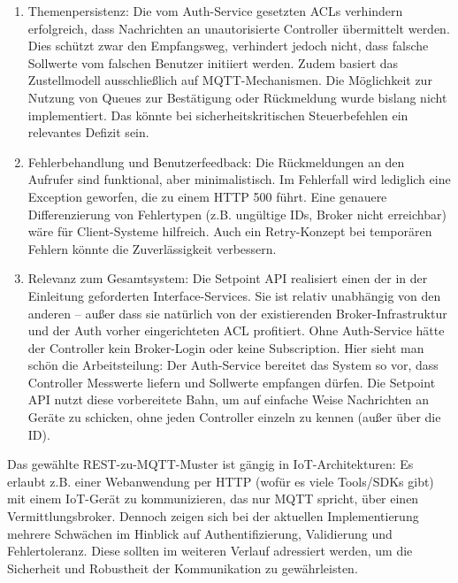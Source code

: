 \begin{enumerate}
    \item Themenpersistenz: Die vom Auth-Service gesetzten ACLs verhindern erfolgreich, dass Nachrichten an unautorisierte Controller übermittelt werden. Dies schützt zwar den Empfangsweg, verhindert jedoch nicht, dass falsche Sollwerte vom falschen Benutzer initiiert werden. Zudem basiert das Zustellmodell ausschließlich auf MQTT-Mechanismen. Die Möglichkeit zur Nutzung von Queues zur Bestätigung oder Rückmeldung wurde bislang nicht implementiert. Das könnte bei sicherheitskritischen Steuerbefehlen ein relevantes Defizit sein.
    \item Fehlerbehandlung und Benutzerfeedback: Die Rückmeldungen an den Aufrufer sind funktional, aber minimalistisch. Im Fehlerfall wird lediglich eine Exception geworfen, die zu einem HTTP 500 führt. Eine genauere Differenzierung von Fehlertypen (z.B. ungültige IDs, Broker nicht erreichbar) wäre für Client-Systeme hilfreich. Auch ein Retry-Konzept bei temporären Fehlern könnte die Zuverlässigkeit verbessern.
    \item Relevanz zum Gesamtsystem: Die Setpoint API realisiert einen der in der Einleitung geforderten Interface-Services. Sie ist relativ unabhängig von den anderen – außer dass sie natürlich von der existierenden Broker-Infrastruktur und der Auth vorher eingerichteten ACL profitiert. Ohne Auth-Service hätte der Controller kein Broker-Login oder keine Subscription. Hier sieht man schön die Arbeitsteilung: Der Auth-Service bereitet das System so vor, dass Controller Messwerte liefern und Sollwerte empfangen dürfen. Die Setpoint API nutzt diese vorbereitete Bahn, um auf einfache Weise Nachrichten an Geräte zu schicken, ohne jeden Controller einzeln zu kennen (außer über die ID).
\end{enumerate}

Das gewählte REST-zu-MQTT-Muster ist gängig in IoT-Architekturen: Es erlaubt z.B. einer Webanwendung per HTTP (wofür es viele Tools/SDKs gibt) mit einem IoT-Gerät zu kommunizieren, das nur MQTT spricht, über einen Vermittlungsbroker. Dennoch zeigen sich bei der aktuellen Implementierung mehrere Schwächen im Hinblick auf Authentifizierung, Validierung und Fehlertoleranz. Diese sollten im weiteren Verlauf adressiert werden, um die Sicherheit und Robustheit der Kommunikation zu gewährleisten.
